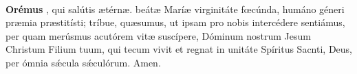 \\[2mm]
\textbf{Orémus}
, qui salútis {\ae}térn{\ae}. beát{\ae} Marí{\ae} virginitáte f{\oe}cúnda, humáno géneri pr{\ae}mia pr{\ae}stitísti; tríbue, qu{\ae}sumus, ut ipsam pro nobis
intercédere sentiámus, per quam merúsmus acutórem vit{\ae} suscípere, Dóminum nostrum Jesum Christum Filium tuum, qui tecum vivit et regnat in unitáte Spíritus Sacnti, Deus, per ómnia
s{\'\ae}cula s{\'\ae}culórum. Amen.